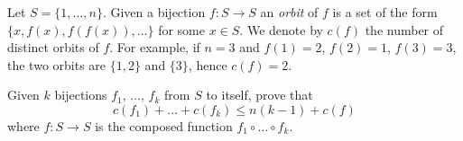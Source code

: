 Let $S = \{1, \dots, n\}$. Given a bijection $f : S \to S$ an \emph{orbit} of $f$ is a set of the form $\{x, f(x), f(f(x)), \dots \}$ for some $x \in S$. We denote by $c(f)$ the number of distinct orbits of $f$.  For example, if $n=3$ and $f(1)=2$, $f(2)=1$, $f(3)=3$, the two orbits are $\{1,2\}$ and $\{3\}$, hence $c(f)=2$.

Given $k$ bijections $f_1$, $\ldots$, $f_k$ from $S$ to itself, prove that \[ c(f_1) + \dots + c(f_k) \le n(k-1) + c(f) \] where $f : S \to S$ is the composed function $f_1 \circ \dots \circ f_k$.
